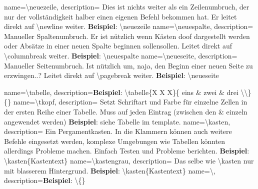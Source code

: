 {
    name={\textbackslash neuezeile},
    description={
            Dies ist nichts weiter als ein Zeilenumbruch, der nur der vollständigkeit halber einen eigenen Befehl bekommen hat. Er leitet direkt auf \textbackslash newline weiter. \newline
            \textbf{Beispiel}: \textbackslash neuezeile
        }
}
{
    name={\textbackslash neuespalte},
    description={
            Manueller Spaltenumbruch. Er ist nützlich wenn Kästen doof dargestellt werden oder Absätze in einer neuen Spalte beginnen sollensollen. Leitet direkt auf \textbackslash columnbreak weiter. \newline
            \textbf{Beispiel}: \textbackslash neuespalte
        }
}
{
    name={\textbackslash neueseite},
    description={
            Manueller Seitenumbruch. Ist nützlich um, naja, den Beginn einer neuen Seite zu erzwingen..? Leitet direkt auf \textbackslash pagebreak weiter. \newline
            \textbf{Beispiel}: \textbackslash neueseite
        }
}

{
    name={\textbackslash tabelle},
    description={\textbf{Beispiel}: \textbackslash tabelle\{X X X\}\{ eins \& zwei \& drei \textbackslash \textbackslash \}\{\}\newline
        }
}
{
    name={\textbackslash tkopf},
    description={
            Setzt Schriftart und Farbe für einzelne Zellen in der ersten Reihe einer Tabelle. Muss auf jeden Eintrag (zwischen den \& einzeln angewendet werden)\newline
            \textbf{Beispiel}: siehe Tabelle im template.
        }
}
{
    name={\textbackslash kasten},
    description={
            Ein Pergamentkasten. In die Klammern können auch weitere Befehle eingesetzt werden, komplexe Umgebungen wie Tabellen könnten allerdings Probleme machen. Einfach Testen und Probleme berichten.\newline
            \textbf{Beispiel}: \textbackslash kasten\{Kastentext\}
        }
}
{
    name={\textbackslash kastengrau},
    description={
            Das selbe wie \textbackslash kasten nur mit blasserem Hintergrund.
            \newline
            \textbf{Beispiel}: \textbackslash kasten\{Kastentext\}
        }
}
\newglossaryentry{}
{
    name={\textbackslash },
    description={\textbf{Beispiel}: \textbackslash \{\}\newline
        }
}



